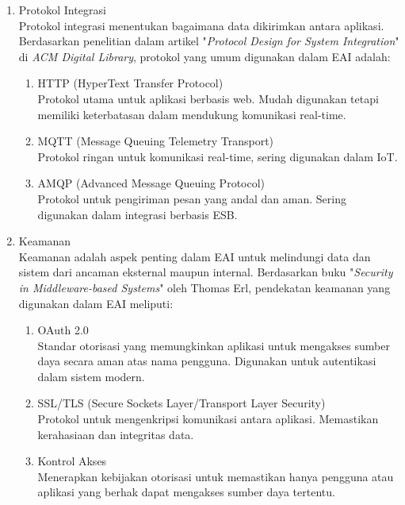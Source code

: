 \begin{enumerate}[label*=\arabic*.,ref=\arabic*]
\begin{enumerate}[label=\alph*.]
            \item Protokol Integrasi \\
            Protokol integrasi menentukan bagaimana data dikirimkan antara aplikasi. Berdasarkan penelitian dalam artikel "\textit{Protocol Design for System Integration}" di \textit{ACM Digital Library}, protokol yang umum digunakan dalam EAI adalah:
            \begin{enumerate}[label=\alph*.]
                \item HTTP (HyperText Transfer Protocol) \\ 
                Protokol utama untuk aplikasi berbasis web. Mudah digunakan tetapi memiliki keterbatasan dalam mendukung komunikasi real-time.
                \item MQTT (Message Queuing Telemetry Transport) \\ 
                Protokol ringan untuk komunikasi real-time, sering digunakan dalam IoT.
                \item AMQP (Advanced Message Queuing Protocol) \\ 
                Protokol untuk pengiriman pesan yang andal dan aman. Sering digunakan dalam integrasi berbasis ESB.
            \end{enumerate}

            \item Keamanan \\
            Keamanan adalah aspek penting dalam EAI untuk melindungi data dan sistem dari ancaman eksternal maupun internal. Berdasarkan buku "\textit{Security in Middleware-based Systems}" oleh Thomas Erl, pendekatan keamanan yang digunakan dalam EAI meliputi:
            \begin{enumerate}[label=\alph*.]
                \item OAuth 2.0 \\ 
                Standar otorisasi yang memungkinkan aplikasi untuk mengakses sumber daya secara aman atas nama pengguna. Digunakan untuk autentikasi dalam sistem modern.
                \item SSL/TLS (Secure Sockets Layer/Transport Layer Security) \\ 
                Protokol untuk mengenkripsi komunikasi antara aplikasi. Memastikan kerahasiaan dan integritas data.
                \item Kontrol Akses \\ 
                Menerapkan kebijakan otorisasi untuk memastikan hanya pengguna atau aplikasi yang berhak dapat mengakses sumber daya tertentu.
            \end{enumerate}
    \end{enumerate}

\end{enumerate}